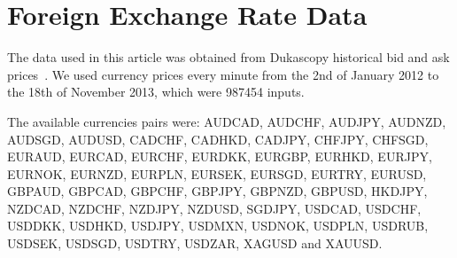 \section{Foreign Exchange Rate Data} \label{sec:data}

The data used in this article was obtained from Dukascopy historical
bid and ask prices~\cite{dukascopy}. We used currency prices every
minute from the 2nd of January 2012 to the 18th of November 2013,
which were 987454 inputs.

The available currencies pairs were: AUDCAD, AUDCHF, AUDJPY, AUDNZD,
AUDSGD, AUDUSD, CADCHF, CADHKD, CADJPY, CHFJPY, CHFSGD, EURAUD,
EURCAD, EURCHF, EURDKK, EURGBP, EURHKD, EURJPY, EURNOK, EURNZD,
EURPLN, EURSEK, EURSGD, EURTRY, EURUSD, GBPAUD, GBPCAD, GBPCHF,
GBPJPY, GBPNZD, GBPUSD, HKDJPY, NZDCAD, NZDCHF, NZDJPY, NZDUSD,
SGDJPY, USDCAD, USDCHF, USDDKK, USDHKD, USDJPY, USDMXN, USDNOK,
USDPLN, USDRUB, USDSEK, USDSGD, USDTRY, USDZAR, XAGUSD and XAUUSD.


